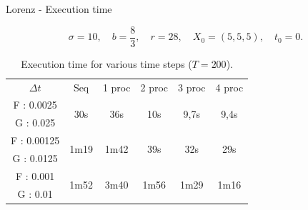 	\begin{frame}{Lorenz - Execution time}

	$$\sigma=10, \quad b=\frac{8}{3}, \quad r=28, \quad X_0=(5,5,5), \quad t_0=0.$$
	\begin{table}[H]
		\centering
		\begin{tabular}{| c || c | c | c | c | c |}
			\hline
			\multirow{2}{1.5 cm}{$\Delta t$} & \multirow{2}{1.5 cm}{Seq} & \multirow{2}{1.5 cm}{1 proc} & \multirow{2}{1.5 cm}{2 proc} & \multirow{2}{1.5 cm}{3 proc} &\multirow{2}{1.5 cm}{4 proc} \\
			& & & & & \\
			\hline 
			F : 0.0025 & \multirow{2}{1.5 cm}{30s} & \multirow{2}{1.5 cm}{36s} & \multirow{2}{1.5 cm}{10s} & \multirow{2}{1.5 cm}{9,7s} & \multirow{2}{1.5 cm}{9,4s} \\
			G : 0.025 & & & & & \\
			\hline 
			F : 0.00125 & \multirow{2}{1.5 cm}{1m19} & \multirow{2}{1.5 cm}{1m42} & \multirow{2}{1.5 cm}{39s} & \multirow{2}{1.5 cm}{32s} & \multirow{2}{1.5 cm}{29s} \\
			G : 0.0125 & & & & & \\
			\hline 
			F : 0.001 & \multirow{2}{1.5 cm}{1m52} & \multirow{2}{1.5 cm}{3m40} & \multirow{2}{1.5 cm}{1m56} & \multirow{2}{1.5 cm}{1m29} & \multirow{2}{1.5 cm}{1m16} \\
			G : 0.01 & & & & & \\	 
			\hline
		\end{tabular}
		\caption{Execution time for various time steps ($T=200$).}
		\label{time}
	\end{table}

\end{frame}